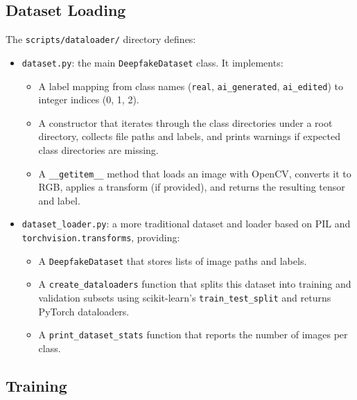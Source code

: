 \subsection{Dataset Loading}

The \texttt{scripts/dataloader/} directory defines:
\begin{itemize}
  \item \texttt{dataset.py}: the main \texttt{DeepfakeDataset} class. It implements:
  \begin{itemize}
    \item A label mapping from class names (\texttt{real}, \texttt{ai\_generated}, \texttt{ai\_edited}) to integer indices (0, 1, 2).
    \item A constructor that iterates through the class directories under a root directory, collects file paths and labels, and prints warnings if expected class directories are missing.
    \item A \texttt{\_\_getitem\_\_} method that loads an image with OpenCV, converts it to RGB, applies a transform (if provided), and returns the resulting tensor and label.
  \end{itemize}
  \item \texttt{dataset\_loader.py}: a more traditional dataset and loader based on PIL and \texttt{torchvision.transforms}, providing:
  \begin{itemize}
    \item A \texttt{DeepfakeDataset} that stores lists of image paths and labels.
    \item A \texttt{create\_dataloaders} function that splits this dataset into training and validation subsets using scikit-learn's \texttt{train\_test\_split} and returns PyTorch dataloaders.
    \item A \texttt{print\_dataset\_stats} function that reports the number of images per class.
  \end{itemize}
\end{itemize}

\subsection{Training}

